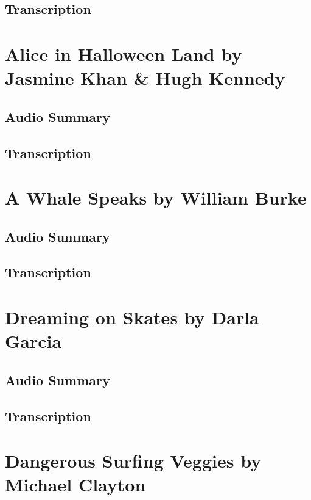 \subsection{Transcription}

\section{Alice in Halloween Land by Jasmine Khan \& Hugh Kennedy}

\subsection{Audio Summary}

\subsection{Transcription}

\section{A Whale Speaks by William Burke}

\subsection{Audio Summary}

\subsection{Transcription}

\section{Dreaming on Skates by Darla Garcia}

\subsection{Audio Summary}

\subsection{Transcription}

\section{Dangerous Surfing Veggies by Michael Clayton}

